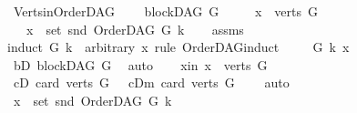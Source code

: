 \begin{isabellebody}
%
\endisatagproof
{\isafoldproof}%
%
\isadelimproof
%
\endisadelimproof
%
\isadelimdocument
%
\endisadelimdocument
%
\isatagdocument
%
\isamarkuptrue%
%
\endisatagdocument
{\isafolddocument}%
%
\isadelimdocument
%
\endisadelimdocument
{}\isamarkupfalse%
\ Verts{\isacharunderscore}{\kern0pt}in{\isacharunderscore}{\kern0pt}OrderDAG{\isacharcolon}{\kern0pt}\ \isanewline
\ \ \ {\isachardoublequoteopen}blockDAG\ G{\isachardoublequoteclose}\isanewline
\ \ \ \ \ {\isachardoublequoteopen}x\ {\isasymin}\ verts\ G{\isachardoublequoteclose}\isanewline
\ \ \ {\isachardoublequoteopen}x\ {\isasymin}\ set\ {\isacharparenleft}{\kern0pt}snd\ {\isacharparenleft}{\kern0pt}OrderDAG\ G\ k{\isacharparenright}{\kern0pt}{\isacharparenright}{\kern0pt}{\isachardoublequoteclose}\isanewline
%
\isadelimproof
\ \ %
\endisadelimproof
%
\isatagproof
{}\isamarkupfalse%
\ assms\isanewline
{}\isamarkupfalse%
{\isacharparenleft}{\kern0pt}induct\ G\ k\ \ arbitrary{\isacharcolon}{\kern0pt}\ x\ rule{\isacharcolon}{\kern0pt}\ OrderDAG{\isachardot}{\kern0pt}induct{\isacharparenright}{\kern0pt}\isanewline
\ \ \isamarkupfalse%
\ {\isacharparenleft}{\kern0pt}{}\ G\ k\ x{\isacharparenright}{\kern0pt}\isanewline
\ \ \isamarkupfalse%
\ \isamarkupfalse%
\ bD{\isacharcolon}{\kern0pt}\ {\isachardoublequoteopen}blockDAG\ G{\isachardoublequoteclose}\ \isamarkupfalse%
\ auto\isanewline
\ \ \isamarkupfalse%
\ x{\isacharunderscore}{\kern0pt}in{\isacharcolon}{\kern0pt}\ {\isachardoublequoteopen}x\ {\isasymin}\ verts\ G{\isachardoublequoteclose}\isanewline
\ \ \isamarkupfalse%
\ \isamarkupfalse%
\ {\isacharparenleft}{\kern0pt}cD{}{\isacharparenright}{\kern0pt}\ {\isachardoublequoteopen}card\ {\isacharparenleft}{\kern0pt}verts\ G{\isacharparenright}{\kern0pt}\ {\isacharequal}{\kern0pt}\ {}{\isachardoublequoteclose}{\isacharbar}{\kern0pt}\ {\isacharparenleft}{\kern0pt}cDm{\isacharparenright}{\kern0pt}\ {\isachardoublequoteopen}card\ {\isacharparenleft}{\kern0pt}verts\ G{\isacharparenright}{\kern0pt}\ {\isasymnoteq}\ {}{\isachardoublequoteclose}\ \isamarkupfalse%
\ auto\ \isanewline
\ \ \isamarkupfalse%
\ \isamarkupfalse%
\ {\isachardoublequoteopen}x\ {\isasymin}\ set\ {\isacharparenleft}{\kern0pt}snd\ {\isacharparenleft}{\kern0pt}OrderDAG\ G\ k{\isacharparenright}{\kern0pt}{\isacharparenright}{\kern0pt}{\isachardoublequoteclose}\isanewline

\end{isabellebody}
